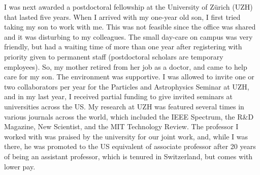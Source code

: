 \documentclass[utf8]{frontiersSCNS} %
\begin{document}
I was next awarded a postdoctoral fellowship at the University of Z\"{u}rich (UZH) that lasted five years. When I arrived with my one-year old son, I first tried taking my son to work with me. This was not feasible since the office was shared and it was disturbing to my colleagues.  The small day-care on campus was very friendly, but had a  waiting time of more than one year after registering with priority given to permanent staff (postdoctoral scholars are temporary employees). So, my mother retired from her job as a doctor, and came to help care for my son. The environment was supportive. I was allowed to invite one or two collaborators per year for the Particles and Astrophysics Seminar at UZH, and in my last year, I received partial funding to give invited seminars at universities across the US. My research at UZH was featured several times in various journals across the world, which included the IEEE Spectrum, the R\&D Magazine, New Scientist, and the MIT Technology Review. The professor I worked with was praised by the university for our joint work, and, while I was there, he was promoted to the US equivalent of associate professor after 20 years of being an assistant professor, which is tenured in Switzerland, but comes with lower pay. 
\end{document}
